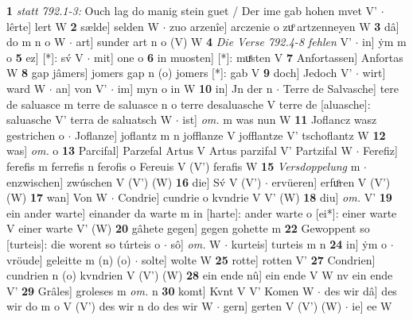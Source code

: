 \documentclass[8pt,a4paper,notitlepage]{article}
\begin{document}
\begin{table}[ht]
\begin{minipage}[t]{0.5\linewidth}
\textbf{1} \textit{statt 792.1-3:} Ouch lag do manig stein guet / Der ime gab hohen mvet V'   $\cdot$ lêrte] lert W \textbf{2} sælde] selden W  $\cdot$ zuo arzenîe] arczenie o zuͦ artzenneyen W \textbf{3} dâ] do m n o W  $\cdot$ art] sunder art n o (V) W \textbf{4} \textit{Die Verse 792.4-8 fehlen} V'   $\cdot$ in] ẏm m o \textbf{5} ez] [*]: sv́ V  $\cdot$ mit] one o \textbf{6} in muosten] [*]: muͤsten V \textbf{7} Anfortassen] Anfortas W \textbf{8} gap jâmers] jomers gap n (o) jomers [*]: gab  V \textbf{9} doch] Jedoch V'  $\cdot$ wirt] ward W  $\cdot$ an] von V'  $\cdot$ im] myn o in W \textbf{10} in] Jn der n  $\cdot$ Terre de Salvasche] tere de saluasce m terre de saluasce n o terre desaluasche V terre de [aluasche]: saluasche V' terra de saluatsch W  $\cdot$ ist] \textit{om.} m was nun W \textbf{11} Joflancz wasz gestrichen o  $\cdot$ Joflanze] joflantz m n jofflanze V jofflantze V' tschoflantz W \textbf{12} was] \textit{om.} o \textbf{13} Parcifal] Parzefal Artus V Artus parzifal V' Partzifal W  $\cdot$ Ferefiz] ferefis m ferrefis n ferofis o Fereuis V (V') ferafis W \textbf{15} \textit{Versdoppelung} m   $\cdot$ enzwischen] zwúschen V (V') (W) \textbf{16} die] Sv́ V (V')  $\cdot$ ervüeren] erfuͦren V (V') (W) \textbf{17} wan] Von W  $\cdot$ Condrie] cundrie o kvndrie V V' (W) \textbf{18} diu] \textit{om.} V' \textbf{19} ein ander warte] einander da warte m in [harte]: ander warte o [ei*]: einer warte V einer warte V' (W) \textbf{20} gâhete gegen] gegen gohette m \textbf{22} Gewoppent so [turteis]: die worent so túrteis o  $\cdot$ sô] \textit{om.} W  $\cdot$ kurteis] turteis m n \textbf{24} in] ẏm o  $\cdot$ vröude] geleitte m (n) (o)  $\cdot$ solte] wolte W \textbf{25} rotte] rotten V' \textbf{27} Condrien] cundrien n (o) kvndrien V (V') (W) \textbf{28} ein ende nû] ein ende V W nv ein ende V' \textbf{29} Grâles] groleses m \textit{om.} n \textbf{30} komt] Kvnt V V' Komen W  $\cdot$ des wir dâ] des wir do m o V (V') des wir n do des wir W  $\cdot$ gern] gerten V (V') (W)  $\cdot$ ie] ee W \newline
\end{minipage}
\end{table}
\newpage
\end{document}
